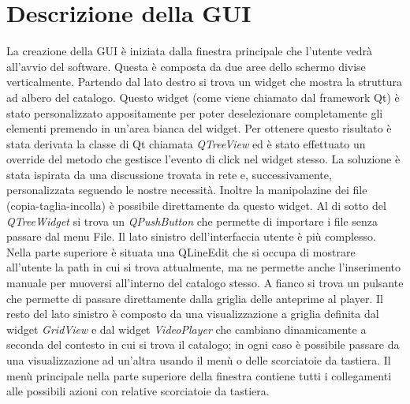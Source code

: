 \section{Descrizione della GUI}

La creazione della GUI è iniziata dalla finestra principale che l'utente vedrà all'avvio del software. Questa è composta da due aree dello schermo divise verticalmente.
Partendo dal lato destro si trova un widget che mostra la struttura ad albero del catalogo. Questo widget (come viene chiamato dal framework Qt) è stato personalizzato 
appositamente per poter deselezionare completamente gli elementi premendo in un'area bianca del widget. Per ottenere questo risultato è stata derivata la classe di Qt chiamata
\emph{QTreeView} ed è stato effettuato un override del metodo che gestisce l'evento di click nel widget stesso. La soluzione è stata ispirata da una discussione trovata in rete e,
successivamente, personalizzata seguendo le nostre necessità. Inoltre la manipolazine dei file (copia-taglia-incolla) è possibile direttamente da questo widget.
Al di sotto del \emph{QTreeWidget} si trova un \emph{QPushButton} che permette di importare i file senza passare dal menu File.
Il lato sinistro dell'interfaccia utente è più complesso. Nella parte superiore è situata una QLineEdit che 
si occupa di mostrare all'utente la path in cui si trova attualmente, ma ne permette anche l'inserimento manuale per muoversi all'interno del catalogo stesso. 
A fianco si trova un pulsante che permette di passare direttamente dalla griglia delle anteprime al player.
Il resto del lato sinistro è composto da una visualizzazione a griglia definita dal widget \emph{GridView} e dal widget \emph{VideoPlayer} che cambiano dinamicamente a seconda 
del contesto in cui si trova il catalogo; in ogni caso è possibile passare da una visualizzazione ad un'altra usando il menù o delle scorciatoie da tastiera. Il menù principale
nella parte superiore della finestra contiene tutti i collegamenti alle possibili azioni con relative scorciatoie da tastiera.

